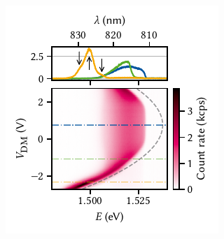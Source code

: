 \begin{marginfigure}
    \centering
    \includegraphics{img/pdf/experiment/doped_M1_05_49-2_difference_mode}
    \caption[
        \protect\newline
    ]{
        \Gls{pl} as function of difference-mode voltage on a large exciton trap.
        The observed Stark shift follows roughly the expected quadratic dispersion, but is offset by \qty{0.75}{\volt} with respect to zero bias.
        Dashed gray line is a guide to the eye of a parabola with curvature \qty{-3.5}{\milli\electronvolt\per\volt\squared}.
        Line cuts in the upper panel are taken at the voltages indicated by dash-dotted lines in the lower, and arrows indicate positions of individual peaks making up the yellow line shape.
    }
    \label{fig:exp:pl:doped_M1_05_49-2_difference_mode}
\end{marginfigure}


